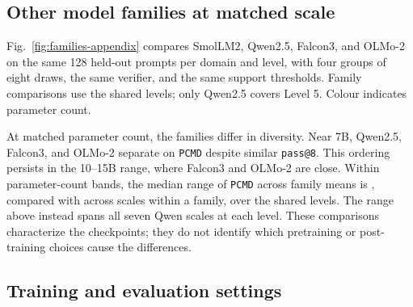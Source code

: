 \documentclass{article}
\newcommand{\1}{\mathbf 1}
\newcommand{\pmd}{\texttt{PCMD}}
\theoremstyle{remark}
\theoremstyle{definition}
\theoremstyle{plain}
\begin{document}
\subsection{Other model families at matched scale}
\label{sec:families-appendix}

Fig.~\ref{fig:families-appendix} compares SmolLM2, Qwen2.5, Falcon3, and
OLMo-2 on the same 128 held-out prompts per domain and level, with four groups
of eight draws, the same verifier, and the same support thresholds. Family
comparisons use the \MDcommonlevels{} shared levels; only Qwen2.5 covers
Level 5. Colour indicates parameter count.

At matched parameter count, the families differ in diversity. Near 7B,
Qwen2.5, Falcon3, and OLMo-2 separate on \pmd{} despite similar
\texttt{pass@8}. This ordering persists in the 10--15B range, where Falcon3
and OLMo-2 are close. Within parameter-count bands, the median range of \pmd{} across
family means is \MDrecipespan{}, compared with \MDwithinrecipespan{} across
scales within a family, over the \MDcommonlevels{} shared levels. The
\MDscalespan{} range above instead spans all seven Qwen scales at each
level. These comparisons characterize the checkpoints; they do not identify
which pretraining or post-training choices cause the differences.

\subsection{Training and evaluation settings}
\label{app:repro-run-contract}
\label{app:comparison-design}
\end{document}
